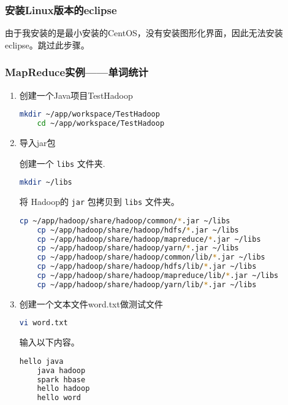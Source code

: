 \documentclass{article}
\newcommand{\notebox}[2][NOTE]{%
    \begin{tcolorbox}[
        colback=cyan!5!white,          
        colframe=cyan!50!black,       
        fonttitle=\bfseries\large,   
        coltitle=white,               
        title=#1,
        rounded corners,              
        boxrule=1.5pt,                
        width=\textwidth,            
        drop shadow=black!30,         
        enhanced,                  
    ]
    #2
    \end{tcolorbox}
}
\newenvironment{enum}{
    \begin{enumerate}[label=(\arabic*), noitemsep]
}{
    \end{enumerate}
}
\begin{document}
\subsubsection{安装Linux版本的eclipse}

\notebox{
    由于我安装的是最小安装的CentOS，没有安装图形化界面，因此无法安装eclipse。跳过此步骤。
}

\subsubsection{MapReduce实例——单词统计}

\begin{enum}
\item 创建一个Java项目TestHadoop

\begin{lstlisting}[language=bash]
    mkdir ~/app/workspace/TestHadoop
    cd ~/app/workspace/TestHadoop
\end{lstlisting}

\item 导入jar包

创建一个 \texttt{libs} 文件夹.

\begin{lstlisting}[language=bash]
    mkdir ~/libs
\end{lstlisting}

将 Hadoop的 \texttt{jar} 包拷贝到 \texttt{libs} 文件夹。

\begin{lstlisting}[language=bash]
    cp ~/app/hadoop/share/hadoop/common/*.jar ~/libs
    cp ~/app/hadoop/share/hadoop/hdfs/*.jar ~/libs
    cp ~/app/hadoop/share/hadoop/mapreduce/*.jar ~/libs
    cp ~/app/hadoop/share/hadoop/yarn/*.jar ~/libs
    cp ~/app/hadoop/share/hadoop/common/lib/*.jar ~/libs
    cp ~/app/hadoop/share/hadoop/hdfs/lib/*.jar ~/libs
    cp ~/app/hadoop/share/hadoop/mapreduce/lib/*.jar ~/libs
    cp ~/app/hadoop/share/hadoop/yarn/lib/*.jar ~/libs
\end{lstlisting}

\item 创建一个文本文件word.txt做测试文件

\begin{lstlisting}[language=bash]
    vi word.txt
\end{lstlisting}

输入以下内容。

\begin{lstlisting}[language=bash]
    hello java
    java hadoop
    spark hbase
    hello hadoop
    hello word
\end{lstlisting}


\end{enum}
\end{document}
